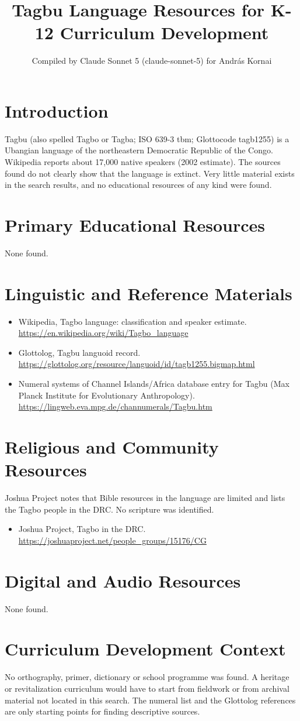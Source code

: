 \documentclass[12pt]{article}
\title{Tagbu Language Resources for K-12 Curriculum Development}
\author{Compiled by Claude Sonnet 5 (claude-sonnet-5) for Andr\'as Kornai}
\date{}
\begin{document}
\maketitle

\section{Introduction}
Tagbu (also spelled Tagbo or Tagba; ISO 639-3 tbm; Glottocode tagb1255) is a Ubangian language of the northeastern Democratic Republic of the Congo. Wikipedia reports about 17,000 native speakers (2002 estimate). The sources found do not clearly show that the language is extinct. Very little material exists in the search results, and no educational resources of any kind were found.

\section{Primary Educational Resources}
None found.

\section{Linguistic and Reference Materials}
\begin{itemize}
\item Wikipedia, Tagbo language: classification and speaker estimate. \url{https://en.wikipedia.org/wiki/Tagbo_language}
\item Glottolog, Tagbu languoid record. \url{https://glottolog.org/resource/languoid/id/tagb1255.bigmap.html}
\item Numeral systems of Channel Islands/Africa database entry for Tagbu (Max Planck Institute for Evolutionary Anthropology). \url{https://lingweb.eva.mpg.de/channumerals/Tagbu.htm}
\end{itemize}

\section{Religious and Community Resources}
Joshua Project notes that Bible resources in the language are limited and lists the Tagbo people in the DRC. No scripture was identified.
\begin{itemize}
\item Joshua Project, Tagbo in the DRC. \url{https://joshuaproject.net/people_groups/15176/CG}
\end{itemize}

\section{Digital and Audio Resources}
None found.

\section{Curriculum Development Context}
No orthography, primer, dictionary or school programme was found. A heritage or revitalization curriculum would have to start from fieldwork or from archival material not located in this search. The numeral list and the Glottolog references are only starting points for finding descriptive sources.
\end{document}
